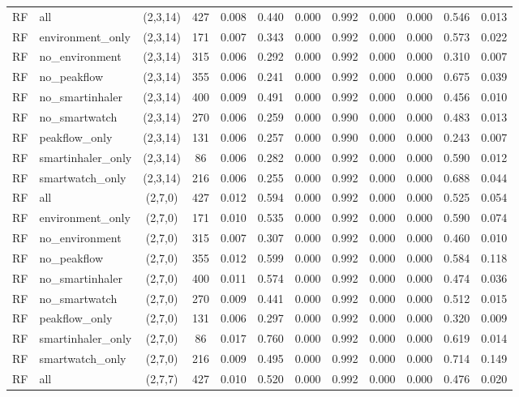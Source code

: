 \begin{longtable}{llcccccccccc}
RF & all & (2,3,14) & 427 & 0.008 & 0.440 & 0.000 & 0.992 & 0.000 & 0.000 & 0.546 & 0.013 \\
RF & environment\_only & (2,3,14) & 171 & 0.007 & 0.343 & 0.000 & 0.992 & 0.000 & 0.000 & 0.573 & 0.022 \\
RF & no\_environment & (2,3,14) & 315 & 0.006 & 0.292 & 0.000 & 0.992 & 0.000 & 0.000 & 0.310 & 0.007 \\
RF & no\_peakflow & (2,3,14) & 355 & 0.006 & 0.241 & 0.000 & 0.992 & 0.000 & 0.000 & 0.675 & 0.039 \\
RF & no\_smartinhaler & (2,3,14) & 400 & 0.009 & 0.491 & 0.000 & 0.992 & 0.000 & 0.000 & 0.456 & 0.010 \\
RF & no\_smartwatch & (2,3,14) & 270 & 0.006 & 0.259 & 0.000 & 0.990 & 0.000 & 0.000 & 0.483 & 0.013 \\
RF & peakflow\_only & (2,3,14) & 131 & 0.006 & 0.257 & 0.000 & 0.990 & 0.000 & 0.000 & 0.243 & 0.007 \\
RF & smartinhaler\_only & (2,3,14) & 86 & 0.006 & 0.282 & 0.000 & 0.992 & 0.000 & 0.000 & 0.590 & 0.012 \\
RF & smartwatch\_only & (2,3,14) & 216 & 0.006 & 0.255 & 0.000 & 0.992 & 0.000 & 0.000 & 0.688 & 0.044 \\
RF & all & (2,7,0) & 427 & 0.012 & 0.594 & 0.000 & 0.992 & 0.000 & 0.000 & 0.525 & 0.054 \\
RF & environment\_only & (2,7,0) & 171 & 0.010 & 0.535 & 0.000 & 0.992 & 0.000 & 0.000 & 0.590 & 0.074 \\
RF & no\_environment & (2,7,0) & 315 & 0.007 & 0.307 & 0.000 & 0.992 & 0.000 & 0.000 & 0.460 & 0.010 \\
RF & no\_peakflow & (2,7,0) & 355 & 0.012 & 0.599 & 0.000 & 0.992 & 0.000 & 0.000 & 0.584 & 0.118 \\
RF & no\_smartinhaler & (2,7,0) & 400 & 0.011 & 0.574 & 0.000 & 0.992 & 0.000 & 0.000 & 0.474 & 0.036 \\
RF & no\_smartwatch & (2,7,0) & 270 & 0.009 & 0.441 & 0.000 & 0.992 & 0.000 & 0.000 & 0.512 & 0.015 \\
RF & peakflow\_only & (2,7,0) & 131 & 0.006 & 0.297 & 0.000 & 0.992 & 0.000 & 0.000 & 0.320 & 0.009 \\
RF & smartinhaler\_only & (2,7,0) & 86 & 0.017 & 0.760 & 0.000 & 0.992 & 0.000 & 0.000 & 0.619 & 0.014 \\
RF & smartwatch\_only & (2,7,0) & 216 & 0.009 & 0.495 & 0.000 & 0.992 & 0.000 & 0.000 & 0.714 & 0.149 \\
RF & all & (2,7,7) & 427 & 0.010 & 0.520 & 0.000 & 0.992 & 0.000 & 0.000 & 0.476 & 0.020 \\

\end{longtable}
